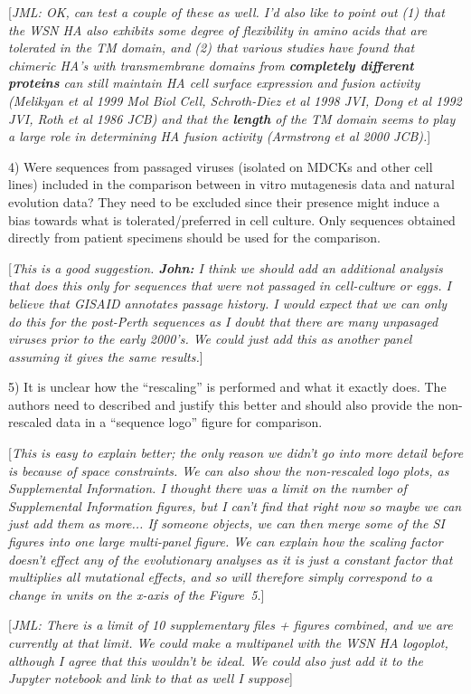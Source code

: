 \documentclass[11pt, oneside]{article}   	%
\newcommand{\comment}[1]{{\color{red}[\textsl{#1}]}}
\begin{document}
\comment{JML: OK, can test a couple of these as well. I'd also like to point out (1) that the WSN HA also exhibits some degree of flexibility in amino acids that are tolerated in the TM domain, and (2) that various studies have found that chimeric HA's with transmembrane domains from {\bf completely different proteins} can still maintain HA cell surface expression and fusion activity (Melikyan et al 1999 Mol Biol Cell, Schroth-Diez et al 1998 JVI, Dong et al 1992 JVI, Roth et al 1986 JCB) and that the {\bf length} of the TM domain seems to play a large role in determining HA fusion activity (Armstrong et al 2000 JCB).} 

4) Were sequences from passaged viruses (isolated on MDCKs and other cell lines) included in the comparison between in vitro mutagenesis data and natural evolution data? They need to be excluded since their presence might induce a bias towards what is tolerated/preferred in cell culture. Only sequences obtained directly from patient specimens should be used for the comparison. 

\comment{This is a good suggestion. 
{\bf John:} I think we should add an additional analysis that does this only for sequences that were not passaged in cell-culture or eggs.
I believe that GISAID annotates passage history.
I would expect that we can only do this for the post-Perth sequences as I doubt that there are many unpasaged viruses prior to the early 2000's.
We could just add this as another panel assuming it gives the same results.}

5) It is unclear how the ``rescaling'' is performed and what it exactly does. The authors need to described and justify this better and should also provide the non-rescaled data in a ``sequence logo'' figure for comparison. 

\comment{This is easy to explain better; the only reason we didn't go into more detail before is because of space constraints.
We can also show the non-rescaled logo plots, as Supplemental Information.
I thought there was a limit on the number of Supplemental Information figures, but I can't find that right now so maybe we can just add them as more... If someone objects, we can then merge some of the SI figures into one large multi-panel figure.
We can explain how the scaling factor doesn't effect any of the evolutionary analyses as it is just a constant factor that multiplies all mutational effects, and so will therefore simply correspond to a change in units on the x-axis of the Figure~5.}

\comment{JML: There is a limit of 10 supplementary files + figures combined, and we are currently at that limit. We could make a multipanel with the WSN HA logoplot, although I agree that this wouldn't be ideal. We could also just add it to the Jupyter notebook and link to that as well I suppose}
\end{document}
